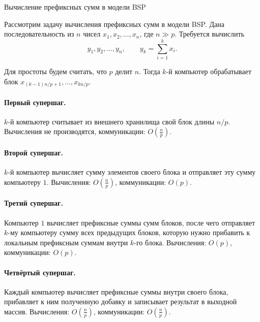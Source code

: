 \begin{Example}{Вычисление префиксных сумм в модели BSP}{}
	
	Рассмотрим задачу вычисления префиксных сумм в модели BSP. Дана последовательность из \(n\) чисел \(x_1, x_2, \dots, x_n\), где \(n \gg p\). Требуется вычислить
	\[
	y_1, y_2, \dots, y_n, \qquad y_k = \sum_{i=1}^k x_i.
	\]
	
	Для простоты будем считать, что \(p\) делит \(n\). Тогда \(k\)-й компьютер обрабатывает блок \(x_{(k-1)n/p+1}, \dots, x_{kn/p}\).
	
	\paragraph{Первый супершаг.}
	\(k\)-й компьютер считывает из внешнего хранилища свой блок длины \(n/p\).
	Вычисления не производятся, коммуникации: \(O\!\left(\frac{n}{p}\right)\).
	
	\paragraph{Второй супершаг.}
	\(k\)-й компьютер вычисляет сумму элементов своего блока и отправляет эту сумму компьютеру \(1\).
	Вычисления: \(O\!\left(\frac{n}{p}\right)\), коммуникации: \(O(p)\).
	
	\paragraph{Третий супершаг.}
	Компьютер \(1\) вычисляет префиксные суммы сумм блоков, после чего отправляет \(k\)-му компьютеру сумму всех предыдущих блоков, которую нужно прибавить к локальным префиксным суммам внутри \(k\)-го блока.
	Вычисления: \(O(p)\), коммуникации: \(O(p)\).
	
	\paragraph{Четвёртый супершаг.}
	Каждый компьютер вычисляет префиксные суммы внутри своего блока, прибавляет к ним полученную добавку и записывает результат в выходной массив.
	Вычисления: \(O\!\left(\frac{n}{p}\right)\), коммуникации: \(O\!\left(\frac{n}{p}\right)\).
	
	\begin{figure}[H]
		\centering
		\begin{tikzpicture}[
			>=Stealth, font=\small,
			box/.style={draw=black, thick, rounded corners=2pt, fill=gray!8,
				minimum width=1.7cm, minimum height=0.85cm, align=center, inner sep=2pt},
			wbox/.style={draw=black, thick, rounded corners=2pt, fill=gray!18,
				minimum width=2.6cm, minimum height=0.85cm, align=center, inner sep=2pt},
			flow/.style={->, line width=0.8pt},
			gth/.style={->, line width=0.9pt},
			sct/.style={->, line width=0.9pt, gray!55!black},
			stepp/.style={font=\small\itshape, gray!55!black, anchor=east},
			]
			

\end{tikzpicture}
\end{figure}
\end{Example}
